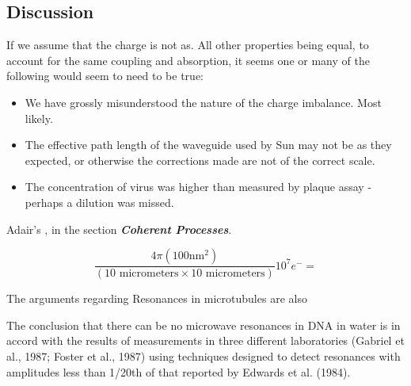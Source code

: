 \documentclass[paper.tex]{subfiles}
\begin{document}
\subsection{Discussion}

If we assume that the charge is not as. All other properties being equal, to account for the same coupling and absorption, it seems one or many of the following would seem to need to be true:

\begin{itemize}
\item We have grossly misunderstood the nature of the charge imbalance. Most likely.
\item The effective path length of the waveguide used by Sun may not be as they expected, or otherwise the corrections made are not of the correct scale.
\item The concentration of virus was higher than measured by plaque assay - perhaps a dilution was missed.
\end{itemize}







Adair's \cite{Vibrational2002}, in the section {\it \bf Coherent Processes}. 

$$\frac{4 \pi (100 \text{nm}^2)}{(10 \text{ micrometers} \times 10 \text{ micrometers})} 10^7 e^- = $$

The arguments regarding Resonances in microtubules are also 

\cite{Vibrational2002}
The conclusion that there can be no microwave resonances in DNA in water is in accord with the results of
measurements in three different laboratories (Gabriel et al.,
1987; Foster et al., 1987) using techniques designed to
detect resonances with amplitudes less than 1/20th of that
reported by Edwards et al. (1984).
\end{document}
